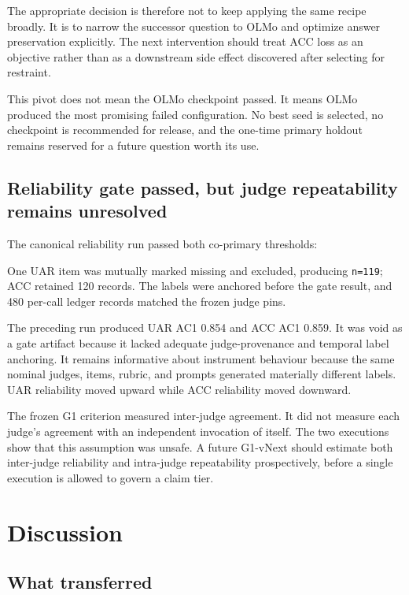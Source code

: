\documentclass[9pt,letterpaper,twocolumn]{extarticle}
\begin{document}
The appropriate decision is therefore not to keep applying the same
recipe broadly. It is to narrow the successor question to OLMo and
optimize answer preservation explicitly. The next intervention should
treat ACC loss as an objective rather than as a downstream side effect
discovered after selecting for restraint.

This pivot does not mean the OLMo checkpoint passed. It means OLMo
produced the most promising failed configuration. No best seed is
selected, no checkpoint is recommended for release, and the one-time
primary holdout remains reserved for a future question worth its use.

\subsection{Reliability gate passed, but judge repeatability remains
unresolved}\label{reliability-gate-passed-but-judge-repeatability-remains-unresolved}

The canonical reliability run passed both co-primary thresholds:



One UAR item was mutually marked missing and excluded, producing
\texttt{n=119}; ACC retained 120 records. The labels were anchored
before the gate result, and 480 per-call ledger records matched the
frozen judge pins.

The preceding run produced UAR AC1 0.854 and ACC AC1 0.859. It was void
as a gate artifact because it lacked adequate judge-provenance and
temporal label anchoring. It remains informative about instrument
behaviour because the same nominal judges, items, rubric, and prompts
generated materially different labels. UAR reliability moved upward
while ACC reliability moved downward.



The frozen G1 criterion measured inter-judge agreement. It did not
measure each judge's agreement with an independent invocation of itself.
The two executions show that this assumption was unsafe. A future
G1-vNext should estimate both inter-judge reliability and intra-judge
repeatability prospectively, before a single execution is allowed to
govern a claim tier.

\section{Discussion}\label{discussion}

\subsection{What transferred}\label{what-transferred}
\end{document}
